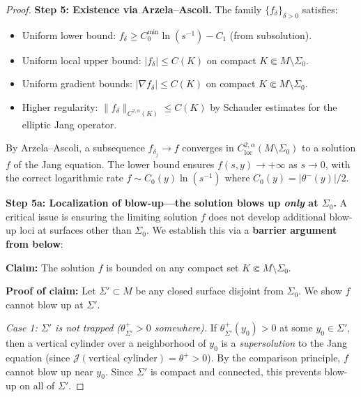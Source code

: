 \begin{proof}
\textbf{Step 5: Existence via Arzela--Ascoli.}
The family $\{f_\delta\}_{\delta > 0}$ satisfies:
\begin{itemize}
    \item Uniform lower bound: $f_\delta \ge C_0^{\min} \ln(s^{-1}) - C_1$ (from subsolution).
    \item Uniform local upper bound: $|f_\delta| \le C(K)$ on compact $K \Subset M \setminus \Sigma_0$.
    \item Uniform gradient bounds: $|\nabla f_\delta| \le C(K)$ on compact $K \Subset M \setminus \Sigma_0$.
    \item Higher regularity: $\|f_\delta\|_{C^{2,\alpha}(K)} \le C(K)$ by Schauder estimates for the elliptic Jang operator.
\end{itemize}
By Arzela--Ascoli, a subsequence $f_{\delta_j} \to f$ converges in $C^{2,\alpha}_{\text{loc}}(M \setminus \Sigma_0)$ to a solution $f$ of the Jang equation. The lower bound ensures $f(s,y) \to +\infty$ as $s \to 0$, with the correct logarithmic rate $f \sim C_0(y) \ln(s^{-1})$ where $C_0(y) = |\theta^-(y)|/2$.

\textbf{Step 5a: Localization of blow-up---the solution blows up \emph{only} at $\Sigma_0$.}
A critical issue is ensuring the limiting solution $f$ does not develop additional blow-up loci at surfaces other than $\Sigma_0$. We establish this via a \textbf{barrier argument from below}:

\textbf{Claim:} The solution $f$ is bounded on any compact set $K \Subset M \setminus \Sigma_0$.

\textbf{Proof of claim:} Let $\Sigma' \subset M$ be any closed surface disjoint from $\Sigma_0$. We show $f$ cannot blow up at $\Sigma'$.

\textit{Case 1: $\Sigma'$ is not trapped ($\theta^+_{\Sigma'} > 0$ somewhere).} If $\theta^+_{\Sigma'}(y_0) > 0$ at some $y_0 \in \Sigma'$, then a vertical cylinder over a neighborhood of $y_0$ is a \emph{supersolution} to the Jang equation (since $\mathcal{J}(\text{vertical cylinder}) = \theta^+ > 0$). By the comparison principle, $f$ cannot blow up near $y_0$. Since $\Sigma'$ is compact and connected, this prevents blow-up on all of $\Sigma'$.


\end{proof}
